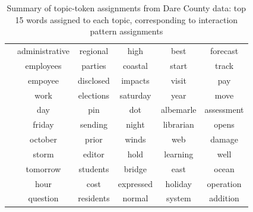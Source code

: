 \begin{table}[ht]
{\begin{tabular}{ |c||c|c|c|c|c|}
  			& administrative & regional & high & best & forecast \\
  			& employees & parties & coastal & start & track \\
  			& empoyee & disclosed & impacts & visit & pay \\
  			& work & elections & saturday & year & move \\
  			& day & pin & dot & albemarle & assessment \\
  			& friday & sending & night & librarian & opens \\
  			& october & prior & winds & web & damage\\
  			& storm &editor & hold & learning & well\\
  			& tomorrow & students & bridge & east& ocean\\
  			& hour & cost & expressed & holiday &  operation\\
  			& question & residents & normal & system & addition
  			\\
  			\hline            				
  		\end{tabular}}
  		\label{table:TableDare}
  		\caption{Summary of topic-token assignments from Dare County data: top 15 words assigned to each topic, corresponding to interaction pattern assignments}               			
  	\end{table} 
  	          			
